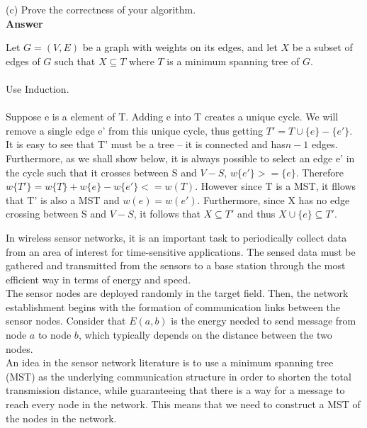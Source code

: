\documentclass{article}
\begin{document}
\noindent (c) Prove the correctness of your algorithm.\\

\textbf{ Answer }
\vspace{0.1in}
\begin{adjustwidth}{1.8em}{0pt}
Let $G = (V,E)$ be a graph with weights on its edges, and let $X$ be a subset of edges of $G$ such that $X \subseteq T$ where $T$ is a minimum spanning tree of $G$.\\ \\
Use Induction.\\ \\
Suppose e is a element of T. Adding e into T creates a unique cycle. We will remove a single edge e' from this unique cycle, thus getting $T' = T \cup \{ e \} - \{ e' \}$. It is easy to see that T' must be a tree -- it is connected and has$n-1$ edges. Furthermore, as we shall show below, it is always possible to select an edge e' in the cycle such that it crosses between S and $V - S$, $w \{ e' \} >= \{ e \}$. Therefore $w \{ T' \} = w \{ T \} + w \{ e \} - w \{ e' \} <= w(T)$. However since T is a MST, it fllows that T' is also a MST and $w(e) = w(e')$. Furthermore, since X has no edge crossing between S and $V - S$, it follows that $X \subseteq T'$ and thus $X \cup \{ e \} \subseteq T'$.
\end{adjustwidth}
\vspace{0.1in}

\vspace{0.2in}

 In wireless sensor networks, it
is an important task to periodically collect data from an area of
interest for time-sensitive applications. The sensed data must be
gathered and transmitted from the sensors to a base station through
the most efficient way in terms of energy and speed.\\

\noindent The sensor nodes are deployed randomly in the target
field. Then, the network establishment begins with the formation of
communication links between the sensor nodes. Consider that $E(a,b)$
is the energy needed to send message from node $a$ to node $b$, which
typically depends on the distance between the two nodes.\\

\noindent An idea in the sensor network literature is to use a minimum
spanning tree (MST) as the underlying communication structure in order
to shorten the total transmission distance, while guaranteeing that
there is a way for a message to reach every node in the network. This
means that we need to construct a MST of the nodes in the network.\\
\end{document}
